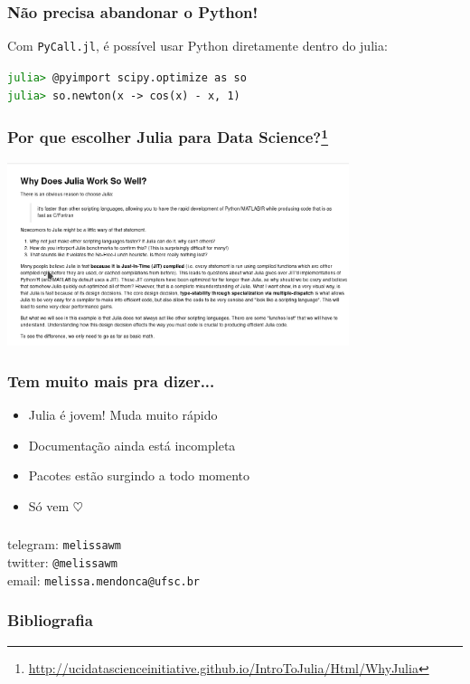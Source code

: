\documentclass{beamer}
\begin{document}
\begin{frame}
	\frametitle{Não precisa abandonar o Python!}
    Com \texttt{PyCall.jl}, é possível usar Python diretamente dentro do julia:
    \begin{center}	
	    \begin{minipage}{8cm}
			\texttt{\textcolor{green}{julia>} @pyimport scipy.optimize as so}\\
			\texttt{\textcolor{green}{julia>} so.newton(x -> cos(x) - x, 1)}
        \end{minipage}
    \end{center}
\end{frame}

\begin{frame}
	\frametitle{Por que escolher Julia para Data Science?\footnote{\url{http://ucidatascienceinitiative.github.io/IntroToJulia/Html/WhyJulia}}}
    \begin{center}
    \includegraphics[width=10cm]{whyjulia.png}
    \end{center}
\end{frame}

\begin{frame}
	\frametitle{Tem muito mais pra dizer...}
    \begin{itemize}
    \item Julia é jovem! Muda muito rápido
    \item Documentação ainda está incompleta
    \item Pacotes estão surgindo a todo momento
    \item Só vem $\heartsuit$
    \end{itemize}
\end{frame}

\begin{frame}
	\frametitle{}
    \begin{center}
    	telegram: \texttt{melissawm}\\
        twitter: \texttt{@melissawm}\\
        email: \texttt{melissa.mendonca@ufsc.br}
    \end{center}
\end{frame}

\begin{frame}[allowframebreaks]%
  \frametitle{Bibliografia}
    {\footnotesize
    
    
    }
\end{frame}
\end{document}

